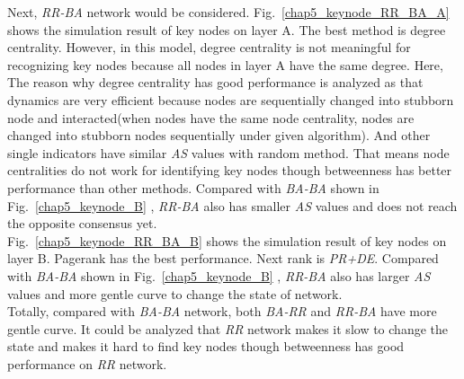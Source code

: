 Next, \textit{RR-BA} network would be considered. Fig.~\ref{chap5_keynode_RR_BA_A} shows the simulation result of key nodes on layer A. The best method is degree centrality. However, in this model, degree centrality is not meaningful for recognizing key nodes because all nodes in layer A have the same degree. Here, The reason why degree centrality has good performance is analyzed as that dynamics are very efficient because nodes are sequentially changed into stubborn node and interacted(when nodes have the same node centrality, nodes are changed into stubborn nodes sequentially under given algorithm). And other single indicators have similar \textit{AS} values with random method. That means node centralities do not work for identifying key nodes though betweenness has better performance than other methods. Compared with \textit{BA-BA} shown in Fig.~\ref{chap5_keynode_B} , \textit{RR-BA} also has smaller \textit{AS} values and does not reach the opposite consensus yet. \\
Fig.~\ref{chap5_keynode_RR_BA_B} shows the simulation result of key nodes on layer B. Pagerank has the best performance. Next rank is \textit{PR+DE}.  Compared with \textit{BA-BA} shown in Fig.~\ref{chap5_keynode_B} , \textit{RR-BA} also has larger \textit{AS} values and more gentle curve to change the state of network. \\ 
Totally, compared with \textit{BA-BA} network, both \textit{BA-RR} and \textit{RR-BA} have more gentle curve. It could be analyzed that \textit{RR} network makes it slow to change the state and makes it hard to find key nodes though betweenness has good performance on \textit{RR} network.  

